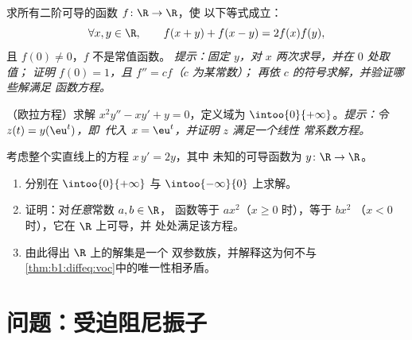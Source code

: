 \begin{exercise}[$\star\star\star$]\label{exo:b1:diffeq:10}
求所有二阶可导的函数 $f \colon \R \to \R$，使
以下等式成立：
\[
\forall x, y \in \R, \qquad f(x + y) + f(x - y) = 2 f(x) f(y),
\]
且 $f(0) \ne 0$，$f$ 不是常值函数。
\emph{提示：固定 $y$，对 $x$ 两次求导，并在 $0$ 处取值；
证明 $f(0) = 1$，且 $f'' = c f$（$c$ 为某常数）；
再依 $c$ 的符号求解，并验证哪些解满足
函数方程。}
\end{exercise}

\begin{exercise}[$\star\star$]\label{exo:b1:diffeq:11}
（欧拉方程）求解 $x^2 y'' - x y' + y = 0$，定义域为
$\intoo{0}{+\infty}$。\emph{提示：令 $z(t) = y(\eu^t)$，即\
代入 $x = \eu^t$，并证明 $z$ 满足一个线性
常系数方程。}
\end{exercise}

\begin{exercise}[$\star\star\star$]\label{exo:b1:diffeq:12}
考虑整个实直线上的方程 $x\,y' = 2y$，其中
未知的可导函数为 $y \colon \R \to \R$。
\begin{enumerate}
  \item 分别在 $\intoo{0}{+\infty}$ 与 $\intoo{-\infty}{0}$ 上求解。
  \item 证明：对\emph{任意}常数 $a, b \in \R$，
        函数等于 $ax^2$（$x \geq 0$ 时），等于 $bx^2$
        （$x < 0$ 时），它在 $\R$ 上可导，并
        处处满足该方程。
  \item 由此得出 $\R$ 上的解集是一个
        双参数族，并解释这为何不与
        \cref{thm:b1:diffeq:voc}中的唯一性相矛盾。
\end{enumerate}
\end{exercise}

\section{问题：受迫阻尼振子}

